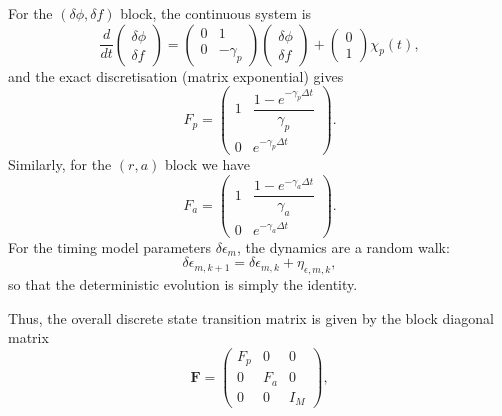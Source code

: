 \documentclass[]{scrartcl}
\begin{document}
	For the $\left(\delta\phi,\delta f\right)$ block, the continuous system is
	\begin{equation}
	\frac{d}{dt}\begin{pmatrix}\delta\phi \\ \delta f\end{pmatrix} 
	=
	\begin{pmatrix}
		0 & 1\\[1mm]
		0 & -\gamma_p
	\end{pmatrix}
	\begin{pmatrix}\delta\phi \\ \delta f\end{pmatrix}
	+
	\begin{pmatrix}0\\1\end{pmatrix}\chi_p(t),
	\end{equation}
	and the exact discretisation (matrix exponential) gives
	\begin{equation}
	F_p = \begin{pmatrix}
		1 & \dfrac{1-e^{-\gamma_p\Delta t}}{\gamma_p}\\[1mm]
		0 & e^{-\gamma_p\Delta t}
	\end{pmatrix}.
	\end{equation}
	Similarly, for the $\left(r,a\right)$ block we have
	\begin{equation}
	F_a = \begin{pmatrix}
		1 & \dfrac{1-e^{-\gamma_a\Delta t}}{\gamma_a}\\[1mm]
		0 & e^{-\gamma_a\Delta t}
	\end{pmatrix}.
	\end{equation}
For the timing model parameters $\delta\epsilon_m$, the dynamics are a random walk:
	\begin{equation}
	\delta\epsilon_{m,k+1} = \delta\epsilon_{m,k} + \eta_{\epsilon,m,k},
	\end{equation}
	so that the deterministic evolution is simply the identity. \newline 
	
	\noindent Thus, the overall discrete state transition matrix is given by the block diagonal matrix
	\begin{equation}
	\boldsymbol{F} = \begin{pmatrix}
		F_p & 0 & 0\\[1mm]
		0 & F_a & 0\\[1mm]
		0 & 0 & I_M
	\end{pmatrix},
	\end{equation}
\end{document}
